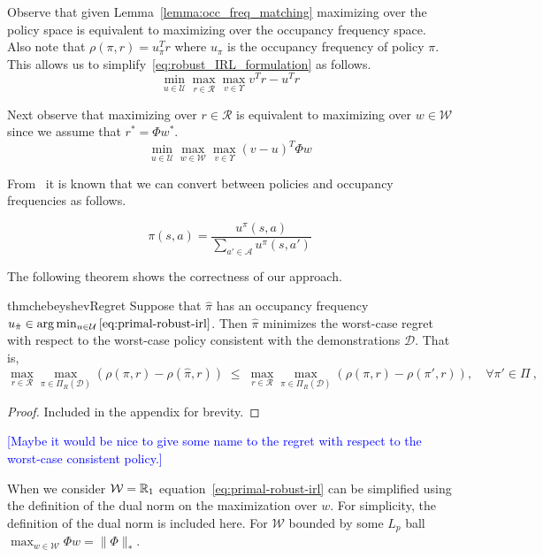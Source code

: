 \documentclass[11pt]{uai2023}
\newcommand{\mm}[1]{\textcolor{blue}{[#1]}}
\begin{document}
Observe that given Lemma~\ref{lemma:occ_freq_matching} maximizing over the policy space is equivalent to maximizing over the occupancy frequency space.
Also note that $\rho(\pi,r) = u_{\pi}^T r$ where $u_{\pi}$ is the occupancy frequency of policy $\pi$. This allows us to simplify~\eqref{eq:robust_IRL_formulation} as follows.
%
\begin{equation}
	\min_{u \in \mathcal{U}} \max_{r \in \mathcal{R}} \max_{v \in \Upsilon} v^T r - u^T r
\end{equation}

Next observe that maximizing over $r \in \mathcal{R}$ is equivalent to maximizing over $w \in \mathcal{W}$ since we assume that $r^* = \Phi w^*$.
%
\begin{equation}\label{eq:primal-robust-irl}
	\min_{u \in \mathcal{U}} \max_{w \in \mathcal{W}} \max_{v \in \Upsilon} (v - u)^T \Phi w
\end{equation}

From~\cite{Puterman1994} it is known that we can convert between policies and occupancy frequencies as follows.

\begin{equation}\label{eq:policy-construction}
	\pi(s, a) = \frac{u^{\pi}(s,a)}{\sum_{a' \in \mathcal{A}} u^{\pi}(s,a')}
\end{equation}

The following theorem shows the correctness of our approach.

\begin{restatable}{thm}{chebeyshevRegret}
\label{thrm:chebeyshevRegret}
	Suppose that $\hat{\pi}$ has an occupancy frequency $u_{\hat{\pi}} \in \arg\min_{u \in \mathcal{U}} \ref{eq:primal-robust-irl}$.
	Then $\hat{\pi}$ minimizes the worst-case regret with respect to the worst-case policy consistent with the demonstrations $\mathcal{D}$. That is,
	\[
		\max_{r\in \mathcal{R}} \max_{\pi \in \Pi_{R}(\mathcal{D})} \left(\rho(\pi, r) - \rho(\hat{\pi}, r)\right)
		\; \le\;
		\max_{r\in \mathcal{R}} \max_{\pi \in \Pi_{R}(\mathcal{D})} \left(\rho(\pi, r) - \rho(\pi', r)\right), \quad  \forall \pi' \in \Pi~,
	\]
\end{restatable}

\begin{proof}
	Included in the appendix for brevity.
\end{proof}

\mm{Maybe it would be nice to give some name to the regret with respect to the worst-case consistent policy.}

When we consider $\mathcal{W} = \mathbb{R}_{1}$ equation~\eqref{eq:primal-robust-irl} can be simplified using the definition of the dual norm on the maximization
over $w$. For simplicity, the definition of the dual norm is included here. For $\mathcal{W}$ bounded by some $L_p$ ball $\max_{w \in \mathcal{W}} \Phi w = \|\Phi\|_*$.
\end{document}
